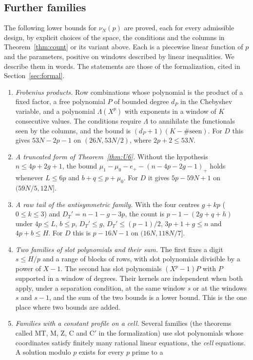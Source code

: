 \subsection{Further families}\label{ssec:families}
The following lower bounds for $\nu_N(p)$ are proved, each for every admissible design, by explicit choices of
the space, the conditions and the columns in Theorem~\ref{thm:count} or its variant above. Each is a
piecewise linear function of $p$ and the parameters, positive on windows described by linear inequalities.
We describe them in words. The statements are those of the formalization, cited in
Section~\ref{sec:formal}.
\begin{enumerate}[label=(\roman*),wide]
\item \emph{Frobenius products.} Row combinations whose polynomial is the product of a fixed factor, a
free polynomial $P$ of bounded degree $d_P$ in the Chebyshev variable, and a polynomial $\Lambda(X^p)$ with
exponents in a window of $K$ consecutive values. The conditions require $\Lambda$ to annihilate the
functionals seen by the columns, and the bound is $(d_P+1)(K-\#\text{seen})$.
For $D$ this gives $53N-2p-1$ on $(26N,53N/2)$, where $2p+2\le53N$.
\item \emph{A truncated form of Theorem~\ref{thm:U6}.} Without the hypothesis $n\le4p+2g+1$, the bound
$\mu_1-\mu_0-e_+-(n-4p-2g-1)_+$ holds whenever $L\le6p$ and $b+q\le p+\mu_0$. For $D$ it gives $5p-59N+1$ on
$(59N/5,12N]$.
\item \emph{A raw tail of the antisymmetric family.} With the four centres $g+kp$ ($0\le k\le3$) and
$D_T'=n-1-g-3p$, the count is
$p-1-(2g+q+h)$ under $4p\le L$, $b\le p$, $D_T'\le g$, $D_T'\le(p-1)/2$, $3p+1+g\le n$ and $4p+b\le H$. For
$D$ this is $p-16N-1$ on $(16N,118N/7]$.
\item \emph{Two families of slot polynomials and their sum.} The first fixes a digit $s\le H/p$ and a range of
blocks of rows, with slot polynomials divisible by a power of $X-1$. The second has slot polynomials
$(X^p-1)P$ with $P$ supported in a window of degrees. Their kernels are independent when both apply,
under a separation condition, at the same window $s$ or at the windows $s$ and $s-1$, and the sum of the
two bounds is a lower bound. This is the one place where two bounds are added.
\item \emph{Families with a constant profile on a cell.} Several families (the theorems called MT, M, Z, C
and $\mathrm C'$ in the formalization) use slot polynomials whose coordinates satisfy finitely many
rational linear equations, the \emph{cell} equations. A solution modulo $p$ exists for every $p$ prime to a

\end{enumerate}
